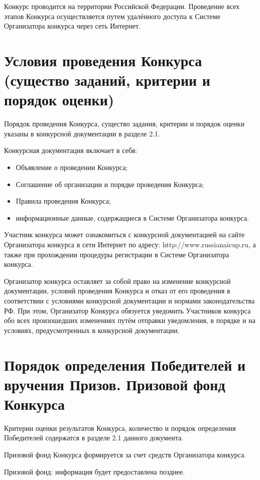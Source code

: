 Конкурс проводится на территории Российской Федерации. Проведение всех этапов Конкурса осуществляется путем удалённого доступа к Системе
Организатора конкурса через сеть Интернет.

\section{Условия проведения Конкурса (существо заданий, критерии и порядок оценки)}

Порядок проведения Конкурса, существо задания, критерии и порядок оценки указаны в конкурсной документации в разделе 2.1.

Конкурсная документация включает в себя:
\begin{itemize}
\item Объявление о проведении Конкурса;
\item Соглашение об организации и порядке проведения Конкурса;
\item Правила проведения Конкурса;
\item информационные данные, содержащиеся в Системе Организатора конкурса.
\end{itemize}

Участник конкурса может ознакомиться с конкурсной документацией на сайте Организатора конкурса в сети Интернет по адресу:
http://www.russianaicup.ru, а также при прохождении процедуры регистрации в Системе Организатора конкурса.

Организатор конкурса оставляет за собой право на изменение конкурсной документации, условий проведения Конкурса и отказ от его проведения в
соответствии с условиями конкурсной документации и нормами законодательства РФ. При этом, Организатор Конкурса обязуется уведомить
Участников конкурса обо всех произошедших изменениях путём отправки уведомления, в порядке и на условиях, предусмотренных в конкурсной
документации.

\section{Порядок определения Победителей и вручения Призов. Призовой фонд Конкурса}

Критерии оценки результатов Конкурса, количество и порядок определения Победителей содержатся в разделе 2.1 данного документа.

Призовой фонд Конкурса формируется за счет средств Организатора конкурса.

Призовой фонд: информация будет предоставлена позднее.

